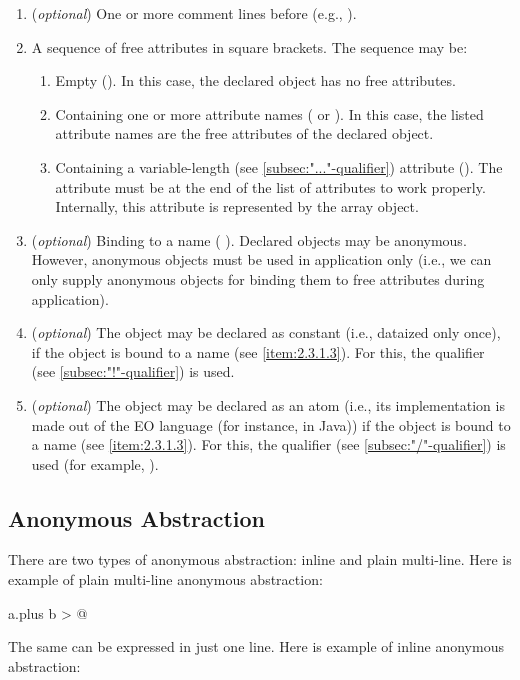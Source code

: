 \documentclass[12pt]{book}
\begin{document}
\begin{enumerate}
    \item (\textit{optional}) One or more comment lines before (e.g., ).
    \item A sequence of free attributes in square brackets. The sequence may be:
    \begin{enumerate}
        \item Empty (\ff{[]}). In this case, the declared object has no free attributes.
        \item Containing one or more attribute names (\ff{[a]} or \ff{[a b c d e]}). In this case, the listed attribute names are the free attributes of the declared object.
        \item Containing a variable-length (see \ref{subsec:"..."-qualifier}) attribute (\ff{[animals...]}). The attribute must be at the end of the list of attributes to work properly. Internally, this attribute is represented by the array object.
    \end{enumerate}
    \item \label{item:2.3.1.3} (\textit{optional}) Binding to a name ( ). Declared objects may be anonymous. However, anonymous objects must be used in application only (i.e., we can only supply anonymous objects for binding them to free attributes during application).
    \item (\textit{optional}) The object may be declared as constant (i.e., dataized only once), if the object is bound to a name (see \ref{item:2.3.1.3}). For this, the \ff{!} qualifier (see \ref{subsec:"!"-qualifier}) is used.
    \item (\textit{optional}) The object may be declared as an atom (i.e., its implementation is made out of the EO language (for instance, in Java)) if the object is bound to a name (see \ref{item:2.3.1.3}). For this, the \ff{/} qualifier (see \ref{subsec:"/"-qualifier}) is used (for example, ).
\end{enumerate}

\subsection{Anonymous Abstraction} \label{subsec:anonymous-abstracion}
There are two types of anonymous abstraction: inline and plain multi-line. Here is example of plain multi-line anonymous abstraction:

\begin{ffcode}
[a b]
  a.plus b > @
\end{ffcode}
The same can be expressed in just one line. Here is example of inline anonymous abstraction:
\end{document}
